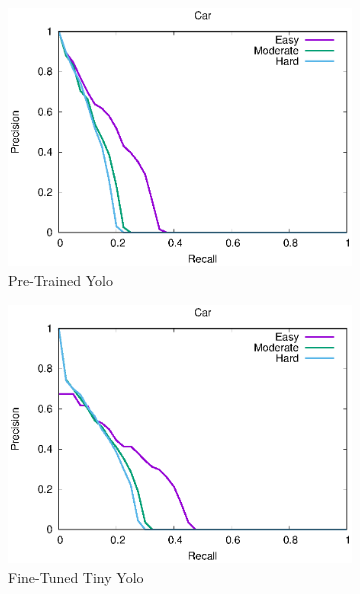 \begin{figure}[h!]
\centering
\begin{subfigure}[t]{.32\textwidth}
    \centering
    \includegraphics[width=1.0\linewidth]{img/yolo_Nov_4/plot_valid_30/car_detection.eps}
    \caption{Pre-Trained Yolo}
\end{subfigure}%
\begin{subfigure}[t]{.32\textwidth}
    \centering
    \includegraphics[width=1.0\linewidth]{img/yolo_Dec_7_tiny/plot_valid_30/car_detection.eps}
    \caption{Fine-Tuned Tiny Yolo}
\end{subfigure}%
\begin{subfigure}[t]{.32\textwidth}
    \centering

\end{subfigure}
\end{figure}
